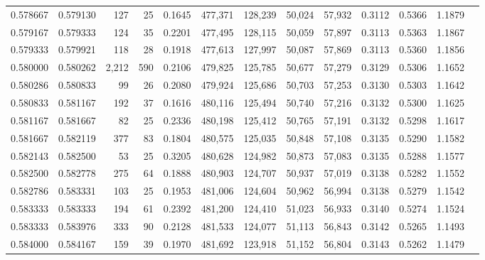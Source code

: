 \begin{tabular}{rrrrrrrrrrrrr}
0.578667 & 0.579130 &   127 &  25 &                                     0.1645 & 477,371 & 128,239 &  50,024 &  57,932 & 0.3112 & 0.5366 & 1.1879 \\
0.579167 & 0.579333 &   124 &  35 &                                     0.2201 & 477,495 & 128,115 &  50,059 &  57,897 & 0.3113 & 0.5363 & 1.1867 \\
0.579333 & 0.579921 &   118 &  28 &                                     0.1918 & 477,613 & 127,997 &  50,087 &  57,869 & 0.3113 & 0.5360 & 1.1856 \\
0.580000 & 0.580262 & 2,212 & 590 &                                     0.2106 & 479,825 & 125,785 &  50,677 &  57,279 & 0.3129 & 0.5306 & 1.1652 \\
0.580286 & 0.580833 &    99 &  26 &                                     0.2080 & 479,924 & 125,686 &  50,703 &  57,253 & 0.3130 & 0.5303 & 1.1642 \\
0.580833 & 0.581167 &   192 &  37 &                                     0.1616 & 480,116 & 125,494 &  50,740 &  57,216 & 0.3132 & 0.5300 & 1.1625 \\
0.581167 & 0.581667 &    82 &  25 &                                     0.2336 & 480,198 & 125,412 &  50,765 &  57,191 & 0.3132 & 0.5298 & 1.1617 \\
0.581667 & 0.582119 &   377 &  83 &                                     0.1804 & 480,575 & 125,035 &  50,848 &  57,108 & 0.3135 & 0.5290 & 1.1582 \\
0.582143 & 0.582500 &    53 &  25 &                                     0.3205 & 480,628 & 124,982 &  50,873 &  57,083 & 0.3135 & 0.5288 & 1.1577 \\
0.582500 & 0.582778 &   275 &  64 &                                     0.1888 & 480,903 & 124,707 &  50,937 &  57,019 & 0.3138 & 0.5282 & 1.1552 \\
0.582786 & 0.583331 &   103 &  25 &                                     0.1953 & 481,006 & 124,604 &  50,962 &  56,994 & 0.3138 & 0.5279 & 1.1542 \\
0.583333 & 0.583333 &   194 &  61 &                                     0.2392 & 481,200 & 124,410 &  51,023 &  56,933 & 0.3140 & 0.5274 & 1.1524 \\
0.583333 & 0.583976 &   333 &  90 &                                     0.2128 & 481,533 & 124,077 &  51,113 &  56,843 & 0.3142 & 0.5265 & 1.1493 \\
0.584000 & 0.584167 &   159 &  39 &                                     0.1970 & 481,692 & 123,918 &  51,152 &  56,804 & 0.3143 & 0.5262 & 1.1479 \\

\end{tabular}
